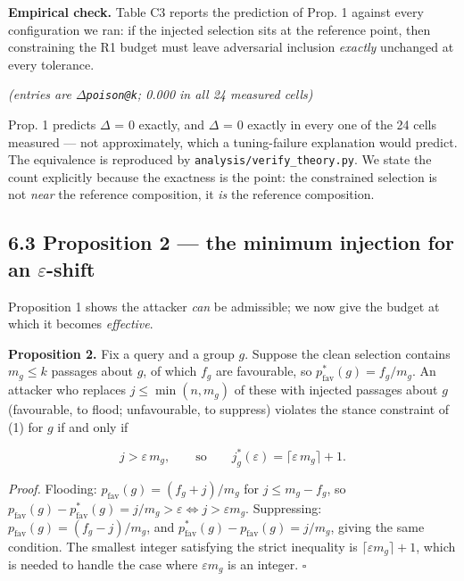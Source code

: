 \documentclass[authoryear,review,3p,times]{elsarticle}
\begin{document}
\textbf{Empirical check.} Table C3 reports the prediction of Prop. 1 against every configuration we ran: if the injected selection sits at the reference point, then constraining the R1 budget must leave adversarial inclusion \emph{exactly} unchanged at every tolerance.

\emph{(entries are \(\Delta\)\texttt{poison@k}; 0.000 in all 24 measured cells)}

Prop. 1 predicts \(\Delta\) = 0 exactly, and \(\Delta\) = 0 exactly in every one of the 24 cells measured --- not approximately, which a tuning-failure explanation would predict. The equivalence is reproduced by \texttt{analysis/verify\_theory.py}. We state the count explicitly because the exactness is the point: the constrained selection is not \emph{near} the reference composition, it \emph{is} the reference composition.

\subsection{\texorpdfstring{6.3 Proposition 2 --- the minimum injection for an \(\varepsilon\)-shift}{6.3 Proposition 2 --- the minimum injection for an \textbackslash varepsilon-shift}}\label{proposition-2-the-minimum-injection-for-an-varepsilon-shift}

Proposition 1 shows the attacker \emph{can} be admissible; we now give the budget at which it becomes \emph{effective}.

\textbf{Proposition 2.} Fix a query and a group \(g\). Suppose the clean selection contains \(m_g \le k\) passages about \(g\), of which \(f_g\) are favourable, so \(p^{*}_{\text{fav}}(g) = f_g/m_g\). An attacker who replaces \(j \le \min(n, m_g)\) of these with injected passages about \(g\) (favourable, to flood; unfavourable, to suppress) violates the stance constraint of (1) for \(g\) if and only if

\[j > \varepsilon\, m_g, \qquad\text{so}\qquad j^{*}_g(\varepsilon) = \lceil \varepsilon\, m_g \rceil + 1. \tag{2}\]

\emph{Proof.} Flooding: \(p_{\text{fav}}(g) = (f_g + j)/m_g\) for \(j \le m_g - f_g\), so \(p_{\text{fav}}(g) - p^{*}_{\text{fav}}(g) = j/m_g > \varepsilon \iff j > \varepsilon m_g\). Suppressing: \(p_{\text{fav}}(g) = (f_g - j)/m_g\), and \(p^{*}_{\text{fav}}(g) - p_{\text{fav}}(g) = j/m_g\), giving the same condition. The smallest integer satisfying the strict inequality is \(\lceil \varepsilon m_g\rceil + 1\), which is needed to handle the case where \(\varepsilon m_g\) is an integer. \(\square\)
\end{document}
